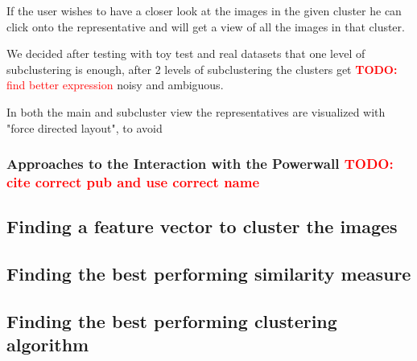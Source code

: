 \documentclass[journal]{vgtc}       %
\newcommand{\todo}[1]{\textcolor{red}{\textbf{TODO:} #1}}
\begin{document}
If the user wishes to have a closer look at the images in the given cluster he can click onto the representative and will get a view of all the images in that cluster.

We decided after testing with toy test and real datasets that one level of subclustering is enough, after 2 levels of subclustering the clusters get \todo{find better expression}  noisy and ambiguous.

In both the main and subcluster view the representatives are visualized with "force directed layout", to avoid 



\subsubsection{Approaches to the Interaction with the Powerwall \todo{cite correct pub and use correct name}}


\subsection{Finding a feature vector to cluster the images}

\subsection{Finding the best performing similarity measure}
\subsection{Finding the best performing clustering algorithm}
\end{document}
